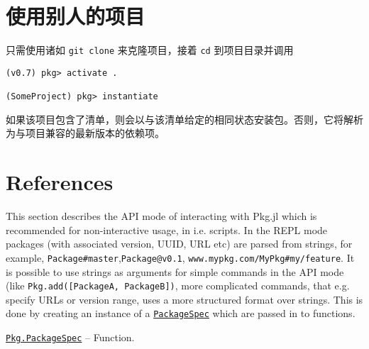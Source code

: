 \hypertarget{6833241097141421015}{}


\section{使用别人的项目}



只需使用诸如 \texttt{git clone} 来克隆项目，接着 \texttt{cd} 到项目目录并调用




\begin{lstlisting}
(v0.7) pkg> activate .

(SomeProject) pkg> instantiate
\end{lstlisting}



如果该项目包含了清单，则会以与该清单给定的相同状态安装包。否则，它将解析为与项目兼容的最新版本的依赖项。



\hypertarget{13487828328085508990}{}


\section{References}



This section describes the {\textquotedbl}API mode{\textquotedbl} of interacting with Pkg.jl which is recommended for non-interactive usage, in i.e. scripts. In the REPL mode packages (with associated version, UUID, URL etc) are parsed from strings, for example, \texttt{{\textquotedbl}Package\#master{\textquotedbl}},\texttt{{\textquotedbl}Package@v0.1{\textquotedbl}}, \texttt{{\textquotedbl}www.mypkg.com/MyPkg\#my/feature{\textquotedbl}}. It is possible to use strings as arguments for simple commands in the API mode (like \texttt{Pkg.add([{\textquotedbl}PackageA{\textquotedbl}, {\textquotedbl}PackageB{\textquotedbl}])}, more complicated commands, that e.g. specify URLs or version range, uses a more structured format over strings. This is done by creating an instance of a \hyperlink{7769325907319883786}{\texttt{PackageSpec}} which are passed in to functions.


\hypertarget{7769325907319883786}{} 
\hyperlink{7769325907319883786}{\texttt{Pkg.PackageSpec}}  -- {Function.}

